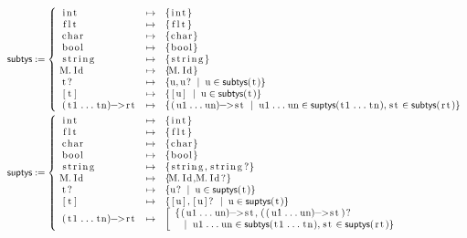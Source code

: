\documentclass{article}
\newcommand{\code}[1]{\lstinline[columns=fixed]{#1}}
\newcommand{\mc}[1]{\textnormal{\code{#1}}}
\begin{document}
				\begin{align*}
					\mathsf{subtys} &:=
						\left\{
							\begin{array}{lll}
								\mc{int} & \mapsto & \{\mc{int}\}\\
								\mc{flt} & \mapsto & \{\mc{flt}\}\\
								\mc{char} & \mapsto & \{\mc{char}\}\\
								\mc{bool} & \mapsto & \{\mc{bool}\}\\
								\mc{string} & \mapsto & \{\mc{string}\}\\
								\mc{M.Id} & \mapsto & \{\mc{M.Id}\}\\
								\mc{t?} & \mapsto & \{\mc{u},\mc{u?} \;\mid\; \mc{u}\in\mathsf{subtys}(\mc{t})\}\\
								\mc{[t]} & \mapsto & \{\mc{[u]} \;\mid\; \mc{u}\in\mathsf{subtys}(\mc{t})\}\\
								\mc{(t1...tn)->rt} & \mapsto &
									\{\mc{(u1...un)->st} \;\mid\; \mc{u1...un}\in\mathsf{suptys}(\mc{t1...tn}),\mc{st}\in\mathsf{subtys}(\mc{rt})\}
							\end{array}
						\right.\\
					\mathsf{suptys} &:=
						\left\{
							\begin{array}{lll}
								\mc{int} & \mapsto & \{\mc{int}\}\\
								\mc{flt} & \mapsto & \{\mc{flt}\}\\
								\mc{char} & \mapsto & \{\mc{char}\}\\
								\mc{bool} & \mapsto & \{\mc{bool}\}\\
								\mc{string} & \mapsto & \{\mc{string},\mc{string?}\}\\
								\mc{M.Id} & \mapsto & \{\mc{M.Id},\mc{M.Id?}\}\\
								\mc{t?} & \mapsto & \{\mc{u?} \;\mid\; \mc{u}\in\mathsf{suptys}(\mc{t})\}\\
								\mc{[t]} & \mapsto & \{\mc{[u]}, \mc{[u]?} \;\mid\; \mc{u}\in\mathsf{suptys}(\mc{t})\}\\
								\mc{(t1...tn)->rt} & \mapsto &
									\left[
									\begin{array}{l}
										\{\mc{(u1...un)->st},\mc{((u1...un)->st)?} \\\ \ \;\mid\; \mc{u1...un}\in\mathsf{subtys}(\mc{t1...tn}),\mc{st}\in\mathsf{suptys}(\mc{rt})\}
									\end{array}
									\right.
							\end{array}
						\right.
				\end{align*}
				
\end{document}
